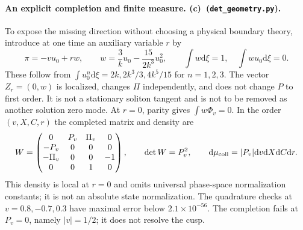 \documentclass[11pt,a4paper]{article}
\newcommand{\Lc}{\textbf{(c)}}
\newcommand{\G}{\texttt{det\_geometry.py}}
\newcommand{\dd}{\mathrm d}
\begin{document}
\paragraph{An explicit completion and finite measure. \Lc\ (\G).}
To expose the missing direction without choosing a physical boundary theory,
introduce at one time an auxiliary variable $r$ by
\begin{equation}
 \pi=-vu_0+r w,\qquad
 w=\frac3k u_0-\frac{15}{2k^3}u_0^2,\qquad
 \int w\dd\xi=1,\quad \int wu_0\dd\xi=0.
\end{equation}
These follow from $\int u_0^n\dd\xi=2k,2k^3/3,4k^5/15$ for $n=1,2,3$.
The vector $Z_r=(0,w)$ is localized, changes $\Pi$ independently, and does
not change $P$ to first order. It is not a stationary soliton tangent and is
not to be removed as another solution zero mode. At $r=0$, parity gives
$\int w\Phi_v=0$. In the order $(v,X,C,r)$ the completed matrix and density are
\begin{equation}
 W=\begin{pmatrix}
 0&P_v&\Pi_v&0\\-P_v&0&0&0\\-\Pi_v&0&0&-1\\0&0&1&0
 \end{pmatrix},\qquad
 \det W=P_v^2,\qquad
 \dd\mu_{\rm coll}=|P_v|\dd v\dd X\dd C\dd r.
 \label{eq:W4}
\end{equation}
This density is local at $r=0$ and omits universal phase-space normalization
constants; it is not an absolute state normalization. The quadrature checks
at $v=0.8,-0.7,0.3$ have maximal error below $2.1\times10^{-56}$.
The completion fails at $P_v=0$, namely $|v|=1/2$; it does not resolve the cusp.
\end{document}
